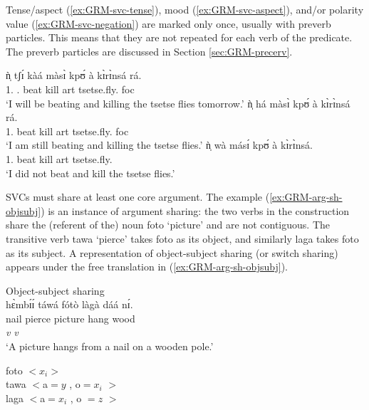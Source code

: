 Tense/aspect (\ref{ex:GRM-svc-tense}), mood (\ref{ex:GRM-svc-aspect}), and/or
polarity value (\ref{ex:GRM-svc-negation}) are marked only once, usually with
preverb particles. This means that they are not repeated for each verb of the  predicate. The preverb particles are discussed in Section
\ref{sec:GRM-precerv}.


\ea\label{ex:GRM-svc-preverb}
 \ea\label{ex:GRM-svc-tense}{
\gll  ǹ̩ tʃɪ́ kàá màsɪ̀   kpʊ́   à  kɪ̀rɪ̀nsá rá.\\
{1.\sg} {\cras} {\fut.\prog}   beat   kill {\sc art} tsetse.fly.{\pl} {\sc foc} \\
\glt `I will be beating and killing the tsetse flies tomorrow.'
}
 \ex\label{ex:GRM-svc-aspect}{
\gll  ǹ̩  há màsɪ̀   kpʊ́   à  kɪ̀rɪ̀nsá rá.\\
  {1.\sg}  {\mod}   beat   kill {\sc art} tsetse.fly.{\pl} {\sc foc}\\
 \glt `I am still beating  and killing the tsetse flies.'
 }
 \ex\label{ex:GRM-svc-negation}{
\gll  ǹ̩   wà másɪ́   kpʊ́   à  kɪ̀rɪ̀nsá.\\
  {1.\sg}  {\neg}   beat   kill {\sc art} tsetse.fly.{\pl}\\
\glt `I did not beat and kill the tsetse flies.'
 }

\z 
 \z

SVCs must share at least one core  argument. The example 
(\ref{ex:GRM-arg-sh-objsubj}) is an instance of argument sharing: the two verbs
in the construction share the (referent of the) noun {\sls foto} `picture' and
are not contiguous. The
transitive verb {\sls tawa} `pierce' takes  {\sls foto} as its object, and similarly
{\sls laga} takes  {\sls foto} as its subject. A representation of 
object-subject
sharing (or switch sharing) appears under the free translation in
(\ref{ex:GRM-arg-sh-objsubj}).


\ea\label{ex:GRM-arg-sh-objsubj}{\rm Object-subject sharing}\\
\glll  hɛ̀mbɪ́ɪ́ táwá fótò làgà dáá nɪ́.\\
nail pierce picture hang wood  {\postp}\\
{} {\it v} {}  {\it v}\\
 \glt `A picture hangs from a nail on a wooden pole.'

{\sls foto} $<x_i>$\\
{\sls tawa} $<${\sc a}$ =  y$ ,  {\sc o}$=x_i$  $> $\\
{\sls laga} $<${\sc a}$ = x_i$ , {\sc o} $= z $  $ >$\\
\z

